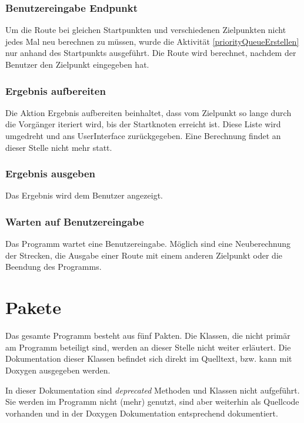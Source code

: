 \documentclass[12pt, a4paper, ngerman]{article}
\newcommand{\todo}[1]{\fcolorbox{red}{yellow}{ \parbox{0.75\linewidth}{#1}}} %
\begin{document}

\subsubsection{Benutzereingabe Endpunkt}
Um die Route bei gleichen Startpunkten und verschiedenen Zielpunkten nicht jedes Mal neu berechnen zu müssen, wurde die Aktivität \ref{priorityQueueErstellen} nur anhand des Startpunkts ausgeführt. Die Route wird berechnet, nachdem der Benutzer den Zielpunkt eingegeben hat.

\subsubsection{Ergebnis aufbereiten}
Die Aktion Ergebnis aufbereiten beinhaltet, dass vom Zielpunkt so lange durch die Vorgänger iteriert wird, bis der Startknoten erreicht ist. Diese Liste wird umgedreht und ans UserInterface zurückgegeben. Eine Berechnung findet an dieser Stelle nicht mehr statt.

\subsubsection{Ergebnis ausgeben}
Das Ergebnis wird dem Benutzer angezeigt.

\subsubsection{Warten auf Benutzereingabe}
Das Programm wartet eine Benutzereingabe. Möglich sind eine Neuberechnung der Strecken, die Ausgabe einer Route mit einem anderen Zielpunkt oder die Beendung des Programms.

\section{Pakete}
Das gesamte Programm besteht aus fünf Pakten. Die Klassen, die nicht primär am Programm beteiligt sind, werden an dieser Stelle nicht weiter erläutert. Die Dokumentation dieser Klassen befindet sich direkt im Quelltext, bzw. kann mit Doxygen ausgegeben werden.

In dieser Dokumentation sind \textit{deprecated} Methoden und Klassen nicht aufgeführt. Sie werden im Programm nicht (mehr) genutzt, sind aber weiterhin als Quellcode vorhanden und in der Doxygen Dokumentation entsprechend  dokumentiert.
\end{document}
